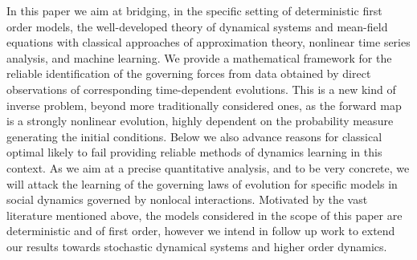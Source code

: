 In this paper we aim at bridging, in the specific setting of {deterministic} first order models, the well-developed theory of dynamical systems and mean-field equations with classical  approaches of approximation theory, nonlinear time series analysis, and machine learning. We  provide a  mathematical framework for the reliable identification of the governing forces from data obtained by direct observations of corresponding time-dependent evolutions. This is a new kind of inverse problem, beyond more traditionally considered ones, as the forward map is a strongly nonlinear  evolution, highly dependent on the probability measure generating the initial conditions.  {Below we also advance reasons for classical optimal likely to  fail providing reliable methods of dynamics learning in this context.} As we aim at a precise quantitative analysis, and to be very concrete, we will  attack the learning of the governing laws of evolution for specific models in social dynamics governed by nonlocal interactions.  { Motivated by the vast literature mentioned above, the models considered in the scope of this paper are deterministic and of  first order,  however we intend in follow up work to extend our results towards stochastic dynamical systems and higher order dynamics.}


